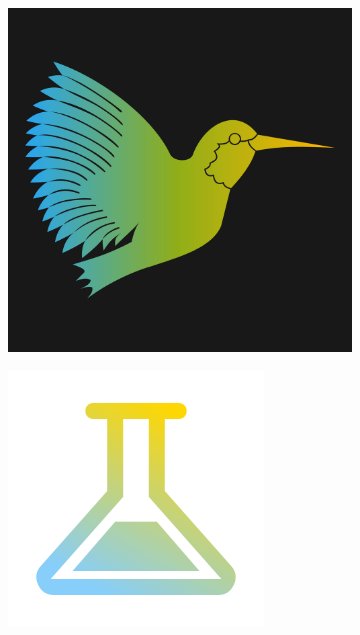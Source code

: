 \documentclass[10pt,letterpaper,twocolumn]{article}
\begin{document}
\begin{figure}[!ht]
  \centering
  \begin{subfigure}[t]{0.5\textwidth}
    \centering
    \includegraphics[width=\linewidth]{"../../../Images/latex"}
    \captionsetup{width=.8\linewidth}
    \caption[LaTeX Logo]{}
    \label{fig:oi}
  \end{subfigure}%
  \hfill
  \begin{subfigure}[t]{0.5\textwidth}
    \centering
    \includegraphics[width=\linewidth]{"../../../Images/science"}

\end{subfigure}
\end{figure}
\end{document}

